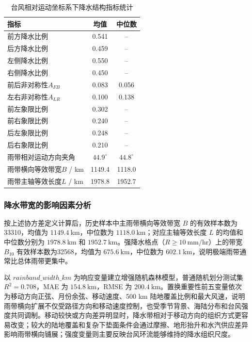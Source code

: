 \documentclass[UTF8,a4paper,zihao=5,fontset=fandol]{ctexart}
\numberwithin{equation}{section}
\numberwithin{figure}{section}
\numberwithin{table}{section}
\begin{document}
\begin{table}[htbp]
    \centering
    \caption{台风相对运动坐标系下降水结构指标统计}
    \label{tab:motion_relative_stats_problem1}
    \begin{tabular}{lcc}
        \hline
        指标 & 均值 & 中位数 \\
        \hline
        前方降水比例 & 0.541 & -- \\
        后方降水比例 & 0.459 & -- \\
        左侧降水比例 & 0.550 & -- \\
        右侧降水比例 & 0.450 & -- \\
        前后非对称性$A_{FB}$ & 0.083 & 0.056 \\
        左右非对称性$A_{LR}$ & 0.100 & 0.138 \\
        前左象限比例 & 0.302 & -- \\
        前右象限比例 & 0.240 & -- \\
        后左象限比例 & 0.248 & -- \\
        后右象限比例 & 0.210 & -- \\
        雨带相对运动方向夹角 & $44.9^\circ$ & $44.8^\circ$ \\
        雨带横向等效带宽$B$ / km & 1149.4 & 1118.0 \\
        雨带主轴等效长度$L$ / km & 1978.8 & 1952.7 \\
        \hline
    \end{tabular}
\end{table}

\subsubsection{降水带宽的影响因素分析}

按上述协方差定义计算后，历史样本中主雨带横向等效带宽 $B$ 的有效样本数为33310，均值为 $1149.4\ \mathrm{km}$，中位数为 $1118.0\ \mathrm{km}$；对应主轴等效长度 $L$ 的均值和中位数分别为 $1978.8\ \mathrm{km}$ 和 $1952.7\ \mathrm{km}$。强降水格点（$R\geq10\ \mathrm{mm/hr}$）上的带宽 $B_{10}$ 有效样本数为32568，均值为 $675.6\ \mathrm{km}$，中位数为 $602.1\ \mathrm{km}$，说明极端雨带通常比总体雨带更集中。

以 $rainband\_width\_km$ 为响应变量建立增强随机森林模型，普通随机划分测试集 $R^2=0.708$，MAE 为 $154.8\ \mathrm{km}$，RMSE 为 $200.4\ \mathrm{km}$。置换重要性前五变量依次为移动方向正弦、月份余弦、移动速度、500 km 陆地覆盖比例和最大风速，说明雨带横向扩展不仅受路径方向和移动速度控制，也受季节背景、海陆分布和台风强度共同调制。移动较快或方向差异明显时，降水带相对于移动方向的组织方式更容易改变；较大的陆地覆盖和复杂下垫面条件会通过摩擦、地形抬升和水汽供应差异影响雨带横向铺展；强度变量则主要反映台风环流能够维持的降水组织尺度。
\end{document}
